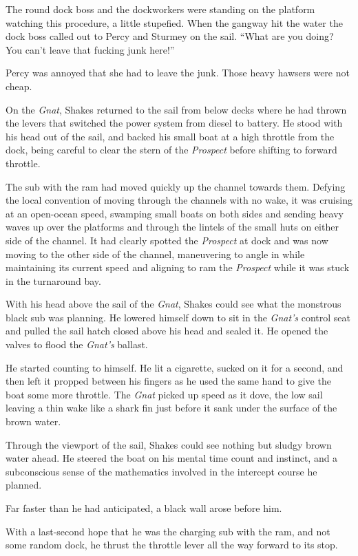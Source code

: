 \documentclass[]{scrbook}
\begin{document}
The round dock boss and the dockworkers were standing on the platform
watching this procedure, a little stupefied. When the gangway hit the
water the dock boss called out to Percy and Sturmey on the sail. ``What
are you doing? You can't leave that fucking junk here!''

Percy was annoyed that she had to leave the junk. Those heavy hawsers
were not cheap.

On the \emph{Gnat}, Shakes returned to the sail from below decks where
he had thrown the levers that switched the power system from diesel to
battery. He stood with his head out of the sail, and backed his small
boat at a high throttle from the dock, being careful to clear the stern
of the \emph{Prospect} before shifting to forward throttle.

The sub with the ram had moved quickly up the channel towards them.
Defying the local convention of moving through the channels with no
wake, it was cruising at an open-ocean speed, swamping small boats on
both sides and sending heavy waves up over the platforms and through the
lintels of the small huts on either side of the channel. It had clearly
spotted the \emph{Prospect} at dock and was now moving to the other side
of the channel, maneuvering to angle in while maintaining its current
speed and aligning to ram the \emph{Prospect} while it was stuck in the
turnaround bay.

With his head above the sail of the \emph{Gnat}, Shakes could see what
the monstrous black sub was planning. He lowered himself down to sit in
the \emph{Gnat's} control seat and pulled the sail hatch closed above
his head and sealed it. He opened the valves to flood the \emph{Gnat's}
ballast.

He started counting to himself. He lit a cigarette, sucked on it for a
second, and then left it propped between his fingers as he used the same
hand to give the boat some more throttle. The \emph{Gnat} picked up
speed as it dove, the low sail leaving a thin wake like a shark fin just
before it sank under the surface of the brown water.

Through the viewport of the sail, Shakes could see nothing but sludgy
brown water ahead. He steered the boat on his mental time count and
instinct, and a subconscious sense of the mathematics involved in the
intercept course he planned.

Far faster than he had anticipated, a black wall arose before him.

With a last-second hope that he was the charging sub with the ram, and
not some random dock, he thrust the throttle lever all the way forward
to its stop.
\end{document}

